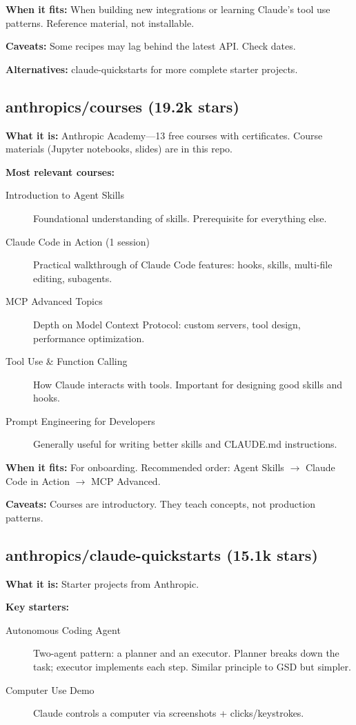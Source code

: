 \documentclass[11pt,a4paper]{article}
\begin{document}
\textbf{When it fits:} When building new integrations or learning Claude's tool use patterns. Reference material, not installable.

\textbf{Caveats:} Some recipes may lag behind the latest API. Check dates.

\textbf{Alternatives:} claude-quickstarts for more complete starter projects.

\subsection{anthropics/courses (19.2k stars)}

\textbf{What it is:} Anthropic Academy---13 free courses with certificates. Course materials (Jupyter notebooks, slides) are in this repo.

\textbf{Most relevant courses:}
\begin{description}
  \item[Introduction to Agent Skills] Foundational understanding of skills. Prerequisite for everything else.
  \item[Claude Code in Action (1 session)] Practical walkthrough of Claude Code features: hooks, skills, multi-file editing, subagents.
  \item[MCP Advanced Topics] Depth on Model Context Protocol: custom servers, tool design, performance optimization.
  \item[Tool Use \& Function Calling] How Claude interacts with tools. Important for designing good skills and hooks.
  \item[Prompt Engineering for Developers] Generally useful for writing better skills and CLAUDE.md instructions.
\end{description}

\textbf{When it fits:} For onboarding. Recommended order: Agent Skills $\rightarrow$ Claude Code in Action $\rightarrow$ MCP Advanced.

\textbf{Caveats:} Courses are introductory. They teach concepts, not production patterns.

\subsection{anthropics/claude-quickstarts (15.1k stars)}

\textbf{What it is:} Starter projects from Anthropic.

\textbf{Key starters:}
\begin{description}
  \item[Autonomous Coding Agent] Two-agent pattern: a planner and an executor. Planner breaks down the task; executor implements each step. Similar principle to GSD but simpler.
  \item[Computer Use Demo] Claude controls a computer via screenshots + clicks/keystrokes.
\end{description}
\end{document}
